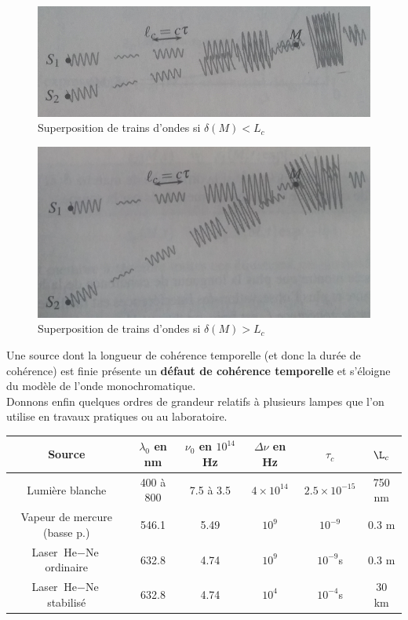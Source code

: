 \documentclass[11pt,a4paper]{report}
\begin{document}
\begin{figure}[h!]
	\begin{center}
		\includegraphics[scale = 0.5]{ordre.png}
	\end{center}
	\caption{Superposition de trains d'ondes si $\delta(M) < L_c$}
\end{figure}

\begin{figure}[h!]
	\begin{center}
		\includegraphics[scale = 0.5]{anarchie.png}
	\end{center}
	\caption{Superposition de trains d'ondes si $\delta(M) > L_c$}
\end{figure}

Une source dont la longueur de cohérence temporelle (et donc la durée de cohérence) est finie présente un \textbf{défaut de cohérence temporelle} et s'éloigne du modèle de l'onde monochromatique.\\

Donnons enfin quelques ordres de grandeur relatifs à plusieurs lampes que l'on utilise en travaux pratiques ou au laboratoire.

\begin{center}
\begin{tabular}{|c|c|c|c|c|c|}
  \hline
  	\textbf{Source}&$\lambda_0$ en nm&$\nu_0$ en $10^{14}$Hz&$\Delta\nu$ en Hz & $\tau_c$ & $\L_c$\\
  \hline
  \hline
  	Lumière blanche & 400 à 800 & 7.5 à 3.5 & $4\times10^{14}$ & $2.5\times10^{-15}$ & 750 nm\\
  \hline 
  	Vapeur de mercure (basse p.) & 546.1 & 5.49 & $10^9$  & $10^{-9}$& 0.3 m\\
  \hline
   	Laser $\text{He}-\text{Ne}$ ordinaire & 632.8 & 4.74 & $10^9$ & $10^{-9}$s & 0.3 m\\
  \hline
   	Laser $\text{He}-\text{Ne}$ stabilisé & 632.8 & 4.74 & $10^4$ & $10^{-4}$s & 30 km\\
  \hline
\end{tabular}
	
\end{center}
\end{document}
